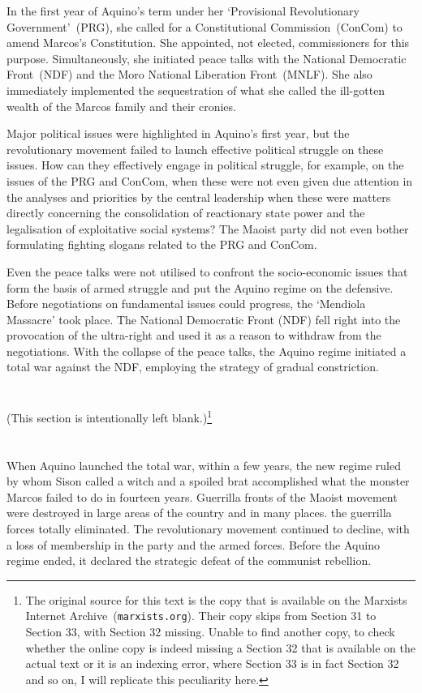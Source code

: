 In the first year of Aquino's term 
under her `Provisional Revolutionary Government'~(PRG), 
she called for a Constitutional Commission~(ConCom) 
to amend Marcos's Constitution. 
She appointed, not elected, commissioners for this purpose. 
Simultaneously, 
she initiated peace talks with the National Democratic Front~(NDF) 
and the Moro National Liberation Front~(MNLF). 
She also immediately implemented the sequestration 
of what she called the ill-gotten wealth of the Marcos family and their cronies.

Major political issues were highlighted 
in Aquino's first year, 
but the revolutionary movement failed 
to launch effective political struggle on these issues. 
How can they effectively engage in political struggle, 
for example, on the issues of the PRG and ConCom,
when these were not even given due attention 
in the analyses and priorities by the central leadership
when these were matters 
directly concerning the consolidation of reactionary state power 
and the legalisation of exploitative social systems? 
The Maoist party did not even bother 
formulating fighting slogans related to the PRG and ConCom.

Even the peace talks were not utilised 
to confront the socio-economic issues 
that form the basis of armed struggle 
and put the Aquino regime on the defensive. 
Before negotiations on fundamental issues could progress, 
the `Mendiola Massacre' took place. 
The National Democratic Front (NDF) fell right into 
the provocation of the ultra-right 
and used it as a reason to withdraw from the negotiations. 
With the collapse of the peace talks, 
the Aquino regime initiated a total war against the NDF, 
employing the strategy of gradual constriction.

\section{}
(This section is intentionally left blank.)\footnote{The original source for this text
is the copy that is available on the Marxists Internet Archive~(\texttt{marxists.org}).
Their copy skips from Section 31 to Section 33, with Section 32 missing. 
Unable to find another copy, 
to check whether the online copy is indeed missing a Section 32 
that is available on the actual text
or it is an indexing error, where Section 33 is in fact Section 32 and so on, 
I will replicate this peculiarity here.}

\section{}
When Aquino launched the total war, 
within a few years, 
the new regime ruled by whom Sison called a witch and a spoiled brat 
accomplished what the monster Marcos failed to do in fourteen years. 
Guerrilla fronts of the Maoist movement 
were destroyed in large areas of the country 
and in many places.
the guerrilla forces totally eliminated. 
The revolutionary movement continued to decline, 
with a loss of membership in the party and the armed forces. 
Before the Aquino regime ended, 
it declared the strategic defeat of the communist rebellion.

